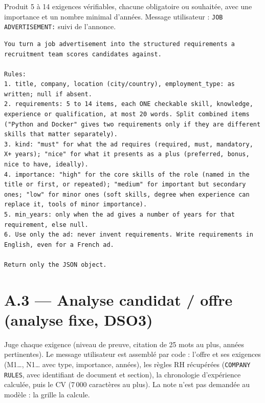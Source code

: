 \documentclass[11pt,a4paper]{report}
\newcommand{\promptlabel}[2][7]{\par\needspace{#1\baselineskip}\smallskip\noindent{\sffamily\bfseries\small\color{promptblue}#2}\par\nopagebreak}
\begin{document}
Produit 5 à 14 exigences vérifiables, chacune obligatoire ou souhaitée, avec une importance et un nombre minimal d'années. Message utilisateur : \texttt{JOB ADVERTISEMENT:} suivi de l'annonce.

\promptlabel{Prompt système}
\begin{lstlisting}[style=prompt]
You turn a job advertisement into the structured requirements a recruitment team scores candidates against.

Rules:
1. title, company, location (city/country), employment_type: as written; null if absent.
2. requirements: 5 to 14 items, each ONE checkable skill, knowledge, experience or qualification, at most 20 words. Split combined items ("Python and Docker" gives two requirements only if they are different skills that matter separately).
3. kind: "must" for what the ad requires (required, must, mandatory, X+ years); "nice" for what it presents as a plus (preferred, bonus, nice to have, ideally).
4. importance: "high" for the core skills of the role (named in the title or first, or repeated); "medium" for important but secondary ones; "low" for minor ones (soft skills, degree when experience can replace it, tools of minor importance).
5. min_years: only when the ad gives a number of years for that requirement, else null.
6. Use only the ad: never invent requirements. Write requirements in English, even for a French ad.

Return only the JSON object.
\end{lstlisting}

\section*{A.3 --- Analyse candidat / offre (analyse fixe, DSO3)}

Juge chaque exigence (niveau de preuve, citation de 25 mots au plus, années pertinentes). Le message utilisateur est assemblé par code : l'offre et ses exigences (M1\ldots, N1\ldots{} avec type, importance, années), les règles RH récupérées (\texttt{COMPANY RULES}, avec identifiant de document et section), la chronologie d'expérience calculée, puis le CV (7\,000 caractères au plus). La note n'est pas demandée au modèle : la grille la calcule.
\end{document}

